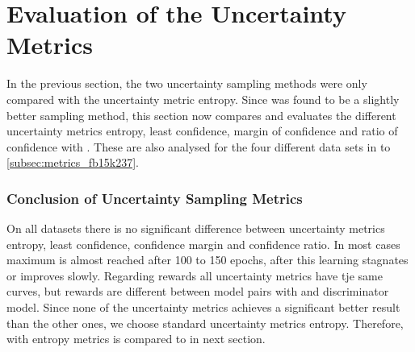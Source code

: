\section{Evaluation of the Uncertainty Metrics}
\label{ch:evaluation:sec:evaluation_metrics}

In the previous section, the two uncertainty sampling methods were only compared with the uncertainty metric entropy.
Since \ussoftmax was found to be a slightly better sampling method, this section now compares and evaluates the different uncertainty metrics entropy, least confidence, margin of confidence and ratio of confidence with \ussoftmax. 
These are also analysed for the four different data sets in  to \ref{subsec:metrics_fb15k237}.









\subsubsection{Conclusion of Uncertainty Sampling Metrics}
\label{subsubsec:evaluation_metrics_conclusion}

On all datasets there is no significant difference between uncertainty metrics entropy, least confidence, confidence margin and confidence ratio.
In most cases maximum is almost reached after 100 to 150 epochs, after this learning stagnates or improves slowly.
Regarding rewards all uncertainty metrics have tje same curves, but rewards are different between model pairs with \transe and \transe discriminator model.
Since none of the uncertainty metrics achieves a significant better result than the other ones, we choose standard uncertainty metrics entropy.
Therefore, \ussoft with entropy metrics is compared to \origsampling in next section.